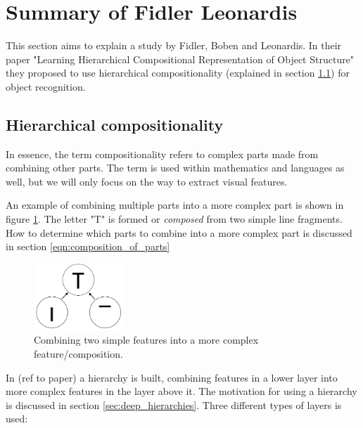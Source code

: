 \section{Summary of Fidler Leonardis }
\label{sec:fidler}
This section aims to explain a study by Fidler, Boben and Leonardis. 
In their paper "Learning Hierarchical Compositional Representation of Object Structure" they proposed to use hierarchical compositionality (explained in section \ref{sec:hierarchical-comp}) for object recognition. 

\subsection{Hierarchical compositionality}
\label{sec:hierarchical-comp}
In essence, the term compositionality refers to complex parts made from combining other parts. 
The term is used within mathematics and languages as well, but we will only focus on the way to extract visual features. 

An example of combining multiple parts into a more complex part is shown in figure \ref{fig:compositionality1}. 
The letter "T" is formed or \textit{composed} from two simple line fragments. 
How to determine which parts to combine into a more complex part is discussed in section \ref{eqn:composition_of_parts}

\begin{figure}[h!] %
\centering
\includegraphics[width=0.3\textwidth]{graphics/compositionality1}
\caption{Combining two simple features into a more complex feature/composition.}
\label{fig:compositionality1}
\end{figure}

In (ref to paper) a hierarchy is built, combining features in a lower layer into more complex features in the layer above it. 
The motivation for using a hierarchy is discussed in section \ref{sec:deep_hierarchies}. 
Three different types of layers is used: 


